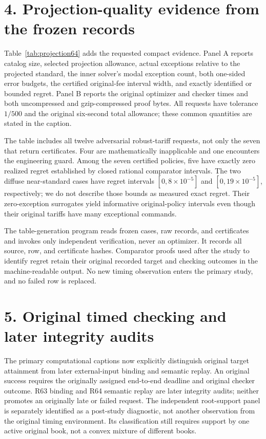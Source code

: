 \documentclass[11pt,letterpaper]{article}
\theoremstyle{definition}\newtheorem{remark}[theorem]{Remark}
\begin{document}
\section*{4. Projection-quality evidence from the frozen records}
Table~\ref{tab:projection64} adds the requested compact evidence. Panel A reports catalog size, selected projection allowance, actual exceptions relative to the projected standard, the inner solver's modal exception count, both one-sided error budgets, the certified original-fee interval width, and exactly identified or bounded regret. Panel B reports the original optimizer and checker times and both uncompressed and gzip-compressed proof bytes. All requests have tolerance $1/500$ and the original six-second total allowance; these common quantities are stated in the caption.

The table includes all twelve adversarial robust-tariff requests, not only the seven that return certificates. Four are mathematically inapplicable and one encounters the engineering guard. Among the seven certified policies, five have exactly zero realized regret established by closed rational comparator intervals. The two diffuse near-standard cases have regret intervals $[0,8\times10^{-5}]$ and $[0,19\times10^{-5}]$, respectively; we do not describe those bounds as measured exact regret. Their zero-exception surrogates yield informative original-policy intervals even though their original tariffs have many exceptional commands.

The table-generation program reads frozen cases, raw records, and certificates and invokes only independent verification, never an optimizer. It records all source, row, and certificate hashes. Comparator proofs used after the study to identify regret retain their original recorded target and checking outcomes in the machine-readable output. No new timing observation enters the primary study, and no failed row is replaced.

\section*{5. Original timed checking and later integrity audits}
The primary computational captions now explicitly distinguish original target attainment from later external-input binding and semantic replay. An original success requires the originally assigned end-to-end deadline and original checker outcome. R63 binding and R64 semantic replay are later integrity audits; neither promotes an originally late or failed request. The independent root-support panel is separately identified as a post-study diagnostic, not another observation from the original timing environment. Its classification still requires support by one active original book, not a convex mixture of different books.
\end{document}
